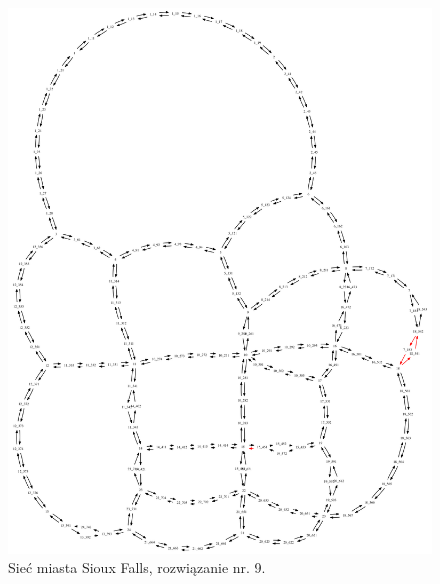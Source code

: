 \documentclass[twoside,12pt]{report}
\begin{document}
\begin{figure}[ht]
\centering
\includegraphics[totalheight=0.580\textheight, angle=90]{img/sioux-out/9/network2}
\caption{Sieć miasta Sioux Falls, rozwiązanie nr. 9.}
\label{sioux9}
\end{figure}
\end{document}
